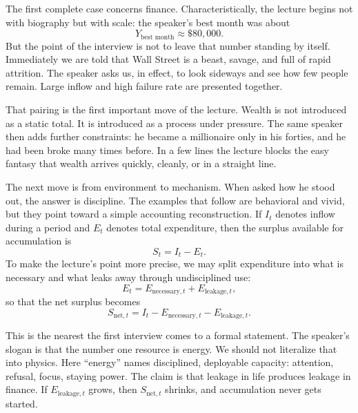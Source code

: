 The first complete case concerns finance. Characteristically, the lecture begins not with biography but with scale: the speaker's best month was about
\begin{equation}
Y_{\text{best month}} \approx \$80{,}000.
\end{equation}
But the point of the interview is not to leave that number standing by itself. Immediately we are told that Wall Street is a beast, savage, and full of rapid attrition. The speaker asks us, in effect, to look sideways and see how few people remain. Large inflow and high failure rate are presented together.

That pairing is the first important move of the lecture. Wealth is not introduced as a static total. It is introduced as a process under pressure. The same speaker then adds further constraints: he became a millionaire only in his forties, and he had been broke many times before. In a few lines the lecture blocks the easy fantasy that wealth arrives quickly, cleanly, or in a straight line.

The next move is from environment to mechanism. When asked how he stood out, the answer is discipline. The examples that follow are behavioral and vivid, but they point toward a simple accounting reconstruction. If \(I_t\) denotes inflow during a period and \(E_t\) denotes total expenditure, then the surplus available for accumulation is
\begin{equation}
S_t = I_t - E_t.
\end{equation}
To make the lecture's point more precise, we may split expenditure into what is necessary and what leaks away through undisciplined use:
\begin{equation}
E_t = E_{\text{necessary},t} + E_{\text{leakage},t},
\end{equation}
so that the net surplus becomes
\begin{equation}
S_{\text{net},t} = I_t - E_{\text{necessary},t} - E_{\text{leakage},t}.
\end{equation}

This is the nearest the first interview comes to a formal statement. The speaker's slogan is that the number one resource is energy. We should not literalize that into physics. Here ``energy'' names disciplined, deployable capacity: attention, refusal, focus, staying power. The claim is that leakage in life produces leakage in finance. If \(E_{\text{leakage},t}\) grows, then \(S_{\text{net},t}\) shrinks, and accumulation never gets started.


